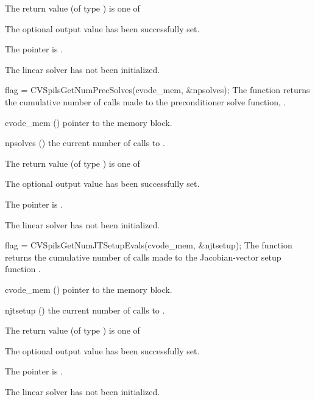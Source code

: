{
  The return value  (of type ) is one of
  \begin{args}
  \item[\Id{CVSPILS\_SUCCESS}]
    The optional output value has been successfully set.
  \item[\Id{CVSPILS\_MEM\_NULL}]
    The  pointer is .
  \item[\Id{CVSPILS\_LMEM\_NULL}]
    The {\cvspils} linear solver has not been initialized.
  \end{args}
}
{}
{
  flag = CVSpilsGetNumPrecSolves(cvode\_mem, \&npsolves);
}
{
  The function  returns the
  cumulative number of calls made to the preconditioner
  solve function, .
}
{
  \begin{args}
  \item[cvode\_mem] ()
    pointer to the {\cvode} memory block.
  \item[npsolves] ()
    the current number of calls to .
  \end{args}
}
{
  The return value  (of type ) is one of
  \begin{args}
  \item[\Id{CVSPILS\_SUCCESS}]
    The optional output value has been successfully set.
  \item[\Id{CVSPILS\_MEM\_NULL}]
    The  pointer is .
  \item[\Id{CVSPILS\_LMEM\_NULL}]
    The {\cvspils} linear solver has not been initialized.
  \end{args}
}
{}
{
  flag = CVSpilsGetNumJTSetupEvals(cvode\_mem, \&njtsetup);
}
{
  The function  returns the
  cumulative number of calls made to the Jacobian-vector setup
  function .
}
{
  \begin{args}
  \item[cvode\_mem] ()
    pointer to the {\cvode} memory block.
  \item[njtsetup] ()
    the current number of calls to .
  \end{args}
}
{
  The return value  (of type ) is one of
  \begin{args}
  \item[\Id{CVSPILS\_SUCCESS}]
    The optional output value has been successfully set.
  \item[\Id{CVSPILS\_MEM\_NULL}]
    The  pointer is .
  \item[\Id{CVSPILS\_LMEM\_NULL}]
    The {\cvspils} linear solver has not been initialized.
  \end{args}
}
